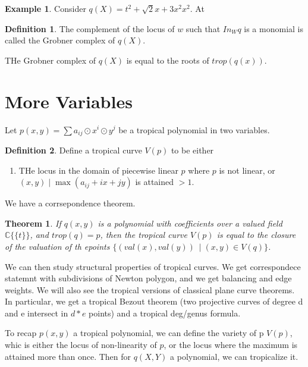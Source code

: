 \documentclass[11pt]{article}
\newtheorem{prototheorem}{Theorem}[section]
\newenvironment{theorem}
   {\begin{prototheorem}}
   {\end{prototheorem}}
\theoremstyle{definition}
\newtheorem{protoexample}{Example}[section]
\newenvironment{ex}
   {\begin{protoexample}}
   {\end{protoexample}}
\newtheorem{protodefinition}{Definition}[section]
\newenvironment{define}
   {\begin{protodefinition}}
   {\end{protodefinition}}
\def\CC{{\mathbb C}}
\begin{document}
\begin{ex}
    Consider $q(X) = t^2 + \sqrt{2}x + 3x^2x^2$. At 
\end{ex}




\begin{define}
    The complement of the locus of $w$ such that $In_W q$ is a monomial is called the Grobner complex of $q(X)$.
\end{define}



THe Grobner complex of $q(X)$ is equal to the roots of $trop(q(x))$.



\section{More Variables}


Let $p(x,y)= \sum a_{ij} \odot x^i\odot y^j$ be a tropical polynomial in two variables. 

\begin{define}
    Define a tropical curve $V(p)$ to be either
    \begin{enumerate}
        \item THe locus in the domain of piecewise linear $p$ where $p$ is not linear, or
        $(x,y)\; |\; \max(a_{ij} +ix+jy)$ is attained $>1$.
    \end{enumerate}
\end{define}

We have a corrsepondence theorem.

\begin{theorem}
    If $q(x,y)$ is a polynomial with coefficients over a valued field $\CC\{\{t\}\}$, and $trop (q) = p$, then the tropical curve $V(p)$ is equal to the closure of the valuation of th epoints $\{(val(x), val(y)) \:\; |\; (x,y) \in V(q)\}$.
\end{theorem}



We can then study structural properties of tropical curves. We get correspondece statemnt with subdivisions of Newton polygon, and we get balancing and edge weights.  We will also see the tropical versions of classical plane curve theorems. In particular, we get a tropical Bezout theorem (two projective curves of degree d and e intersect in $d*e$ points) and a tropical deg/genus formula.


To recap $p(x,y)$ a tropical polynomial, we can define the variety of p $V(p)$, whic is either the locus of non-linearity of $p$, or the locus where the maximum is attained more than once. Then for $q(X,Y)$ a polynomial, we can tropicalize it.
\end{document}
